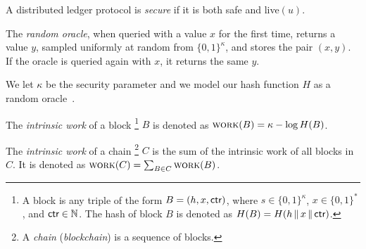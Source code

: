 \begin{definition}[Secure]
  A distributed ledger protocol is \emph{secure} if it is
  both safe and live$(u)$.
\end{definition}

\begin{definition}
  The \emph{random oracle}, when queried with a value $x$ for the first time,
  returns a value $y$, sampled uniformly at random from $\{0, 1\}^\kappa$,
  and stores the pair $(x, y)$. If the oracle
  is queried again with $x$, it returns the same $y$.
\end{definition}

We let $\kappa$ be the security parameter and we
model our hash function $H$ as a random oracle~\cite{ro}.


\begin{definition}
  The \emph{intrinsic work} of a block
  \footnote{A block is any triple of the
  form $B = (h, x, \textsf{ctr})$, where $s \in \{0,1\}^\kappa$, $x \in \{0, 1\}^*$, and $\textsf{ctr} \in \mathbb{N}$.
  The hash of block $B$ is denoted as $H(B) = H(h \,\|\, x \,\|\, \textsf{ctr})$.}
  $B$ is denoted as $\textsc{work}(B) = \kappa - \log H(B)$.
\end{definition}

\begin{definition}
  The \emph{intrinsic work} of a chain
  \footnote{A \emph{chain} (\emph{blockchain}) is a sequence of blocks.}
  $C$ is the sum of the
  intrinsic work of all blocks in $C$.
  It is denoted as $\textsc{work}(C) = \sum_{B \in C}{\textsc{work}(B)}$.
\end{definition}

